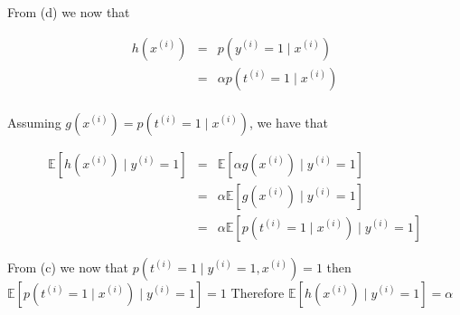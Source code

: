 \begin{answer}

From (d) we now that  

\begin{eqnarray*}
 h(x^{(i)}) &=& p(y^{(i)} = 1\mid x^{(i)}) \\
 &=&\alpha p(t^{(i)} = 1\mid x^{(i)})\\
\end{eqnarray*}
 
Assuming $g(x^{(i)}) =p(t^{(i)} = 1\mid x^{(i)})$, we have that
 
\begin{eqnarray*}
\mathbb{E}[h(x^{(i)})\mid y^{(i)}=1]  &=&
\mathbb{E}[\alpha g(x^{(i)})\mid y^{(i)}=1 ] \\
&=& \alpha \mathbb{E}[g(x^{(i)})\mid y^{(i)}=1 ] \\
&=& \alpha \mathbb{E}[p(t^{(i)} = 1\mid x^{(i)})\mid y^{(i)}=1 ] 
\end{eqnarray*}

From (c) we now that $p(t^{(i)}=1\mid y^{(i)} = 1, x^{(i)}) = 1$ then $\mathbb{E}[p(t^{(i)} = 1\mid x^{(i)})\mid y^{(i)}=1 ] = 1$
Therefore $\mathbb{E}[h(x^{(i)})\mid y^{(i)}=1] = \alpha$
\end{answer}
